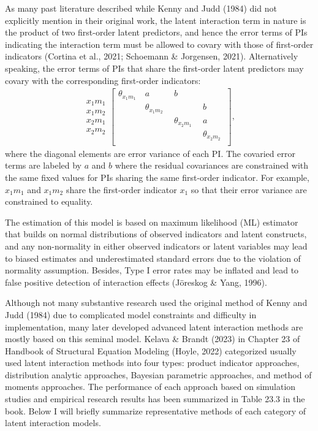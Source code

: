 \documentclass[
  man]{apa7}
\begin{document}
As many past literature described while Kenny and Judd (1984) did not explicitly mention in their original work, the latent interaction term in nature is the product of two first-order latent predictors, and hence the error terms of PIs indicating the interaction term must be allowed to covary with those of first-order indicators (Cortina et al., 2021; Schoemann \& Jorgensen, 2021). Alternatively speaking, the error terms of PIs that share the first-order latent predictors may covary with the corresponding first-order indicators:
\begin{align}
\begin{matrix}
x_{1}m_{1} \\ x_{1}m_{2} \\ x_{2}m_{1} \\ x_{2}m_{2} 
\end{matrix}
\begin{bmatrix}
\theta_{x_{1}m_{1}} & \ a \ & \ b \ \\
\ & \ \theta_{x_{1}m_{2}} \ & \ & \ b \ \\
\ & \ & \ \theta_{x_{2}m_{1}} \ & \ a \ \\
\ & \ & \ & \ \theta_{x_{2}m_{2}} \ \\
\end{bmatrix},
\end{align}
where the diagonal elements are error variance of each PI. The covaried error terms are labeled by \(a\) and \(b\) where the residual covariances are constrained with the same fixed values for PIs sharing the same first-order indicator. For example, \(x_{1}m_{1}\) and \(x_{1}m_{2}\) share the first-order indicator \(x_{1}\) so that their error variance are constrained to equality.

The estimation of this model is based on maximum likelihood (ML) estimator that builds on normal distributions of observed indicators and latent constructs, and any non-normality in either observed indicators or latent variables may lead to biased estimates and underestimated standard errors due to the violation of normality assumption. Besides, Type I error rates may be inflated and lead to false positive detection of interaction effects (Jöreskog \& Yang, 1996).

Although not many substantive research used the original method of Kenny and Judd (1984) due to complicated model constraints and difficulty in implementation, many later developed advanced latent interaction methods are mostly based on this seminal model. Kelava \& Brandt (2023) in Chapter 23 of Handbook of Structural Equation Modeling (Hoyle, 2022) categorized usually used latent interaction methods into four types: product indicator approaches, distribution analytic approaches, Bayesian parametric approaches, and method of moments approaches. The performance of each approach based on simulation studies and empirical research results has been summarized in Table 23.3 in the book. Below I will briefly summarize representative methods of each category of latent interaction models.
\end{document}

